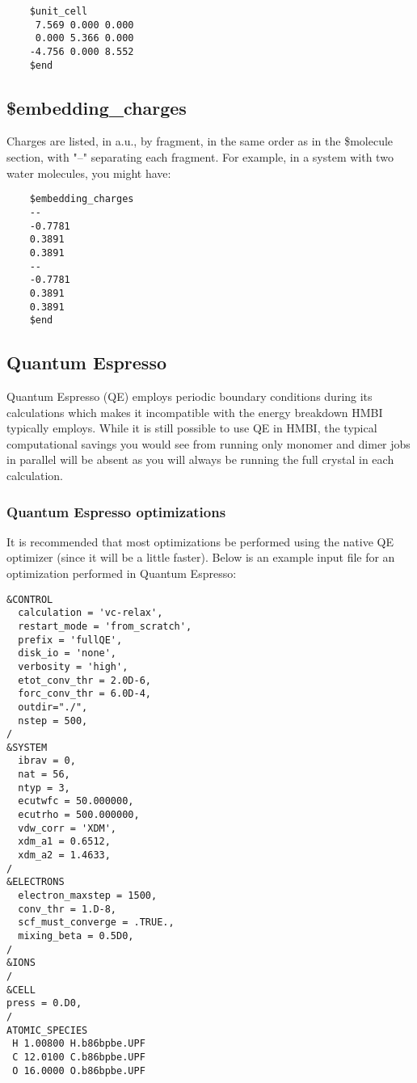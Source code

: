 \documentclass[11pt,letterpaper]{article}
\begin{document}
\begin{spacing}{1.0}
\begin{verbatim}
	$unit_cell
	 7.569 0.000 0.000
	 0.000 5.366 0.000
	-4.756 0.000 8.552
	$end
\end{verbatim}


\subsection{\$embedding\_charges}
	Charges are listed, in a.u., by fragment, in the same order as
        in the \$molecule section, with "--" separating each fragment.
        For example, in a system with two water molecules, you might
        have:

\begin{verbatim}
	$embedding_charges
	--
	-0.7781
	0.3891
	0.3891
	--
	-0.7781
	0.3891
	0.3891
	$end
\end{verbatim}

\subsection{Quantum Espresso}

Quantum Espresso (QE) employs periodic boundary conditions during its calculations which makes it incompatible with the energy breakdown HMBI typically employs. While it is still possible to use QE in HMBI, the typical computational savings you would see from running only monomer and dimer jobs in parallel will be absent as you will always be running the full crystal in each calculation.


\subsubsection{Quantum Espresso optimizations}
It is recommended that most optimizations be performed using the native QE optimizer (since it will be a little faster). Below is an example input file for an optimization performed in Quantum Espresso:

\begin{verbatim}
&CONTROL
  calculation = 'vc-relax',
  restart_mode = 'from_scratch',
  prefix = 'fullQE',
  disk_io = 'none',
  verbosity = 'high',
  etot_conv_thr = 2.0D-6,
  forc_conv_thr = 6.0D-4,
  outdir="./",
  nstep = 500,
/
&SYSTEM
  ibrav = 0,
  nat = 56,
  ntyp = 3,
  ecutwfc = 50.000000,
  ecutrho = 500.000000,
  vdw_corr = 'XDM',
  xdm_a1 = 0.6512,
  xdm_a2 = 1.4633,
/
&ELECTRONS
  electron_maxstep = 1500,
  conv_thr = 1.D-8,
  scf_must_converge = .TRUE.,
  mixing_beta = 0.5D0,
/
&IONS
/
&CELL
press = 0.D0,
/
ATOMIC_SPECIES
 H 1.00800 H.b86bpbe.UPF
 C 12.0100 C.b86bpbe.UPF
 O 16.0000 O.b86bpbe.UPF


\end{verbatim}
\end{spacing}
\end{document}
